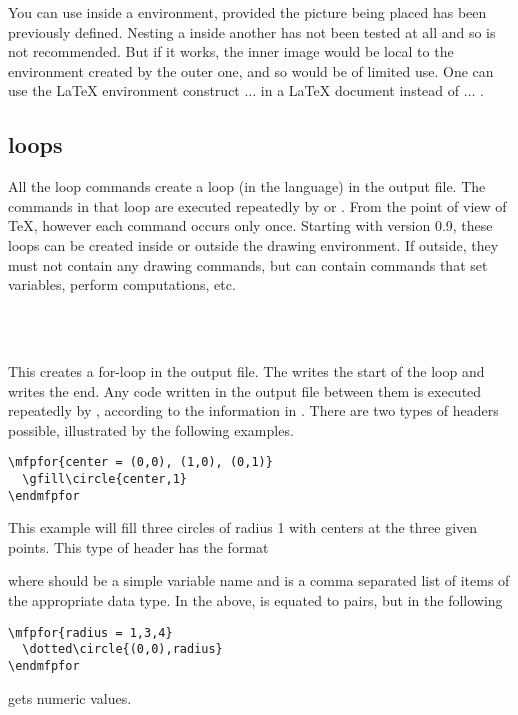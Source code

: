 \documentclass[letterpaper]{article}
\begin{document}
You can use  inside a  environment,
provided the picture being placed has been previously defined. Nesting a
 inside another has not been tested at all and so is not
recommended. But if it works, the inner image would be local to the
environment created by the outer one, and so would be of limited use.
One can use the \LaTeX{} environment construct 
$\ldots$  in a LaTeX document instead of
 $\ldots$ .


\subsection{\CMF{} loops}\label{loops}

All the \mfp{} loop commands create a loop (in the \MF{} language) in
the output file. The \MF{} commands in that loop are executed repeatedly
by \MF{} or \MP{}. From the point of view of \TeX{}, however each
command occurs only once. Starting with version 0.9, these loops can be
created inside or outside the  drawing environment. If
outside, they must not contain any drawing commands, but can contain
commands that set variables, perform computations, etc.

\begin{cd}
\\
 \ \\
%
%
\end{cd}

This creates a for-loop in the \MF{} output file. The  writes
the start of the loop and  writes the end. Any code
written in the output file between them is executed repeatedly by
\MF{}, according to the information in . There are
two types of headers possible, illustrated by the following examples.
\begin{verbatim}
\mfpfor{center = (0,0), (1,0), (0,1)}
  \gfill\circle{center,1}
\endmfpfor
\end{verbatim}
This example will fill three circles of radius 1 with centers at the
three given points. This type of header has the format
\begin{display}
\end{display}
where  should be a simple variable name and 
is a comma separated list of items of the appropriate data type. In the
above,  is equated to pairs, but in the following
\begin{verbatim}
\mfpfor{radius = 1,3,4}
  \dotted\circle{(0,0),radius}
\endmfpfor
\end{verbatim}
 gets numeric values.
\end{document}
